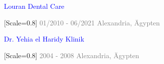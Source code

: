 
{\setmainfont{Rubik Medium}\fontsize{10}{14}\selectfont\textcolor{blue}{Louran Dental Care}}

{[Scale=0.8]
\textcolor{gray}{
\faCalendar\hspace{4pt}01/2010 - 06/2021\hspace{1.5em}
\faMapMarker*\hspace{4pt}Alexandria, Ägypten
}}\\[-10pt]





\vspace{0.7em}


{\setmainfont{Rubik Medium}\fontsize{10}{14}\selectfont\textcolor{blue}{Dr. Yehia el Haridy Klinik}}

{[Scale=0.8]
\textcolor{gray}{
\faCalendar\hspace{4pt}2004 - 2008\hspace{1.5em}
\faMapMarker*\hspace{4pt}Alexandria, Ägypten
}}\\[-10pt]

